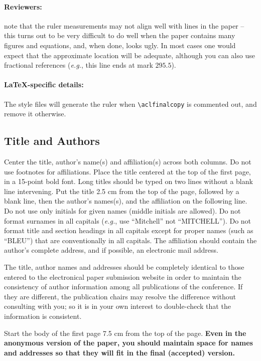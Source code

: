  \paragraph{Reviewers:}
 note that the ruler measurements may not align well with lines in the paper -- this turns out to be very difficult to do well when the paper contains many figures and equations, and, when done, looks ugly.
 In most cases one would expect that the approximate location will be adequate, although you can also use fractional references (\emph{e.g.}, this line ends at mark $295.5$).
 
 \paragraph{\LaTeX-specific details:}
 The style files will generate the ruler when {\small\verb|\aclfinalcopy|} is commented out, and remove it otherwise.
 
 \subsection{Title and Authors}
 \label{ssec:title-authors}
 
 Center the title, author's name(s) and affiliation(s) across both columns.
 Do not use footnotes for affiliations.
 Place the title centered at the top of the first page, in a 15-point bold font.
 Long titles should be typed on two lines without a blank line intervening.
 Put the title 2.5 cm from the top of the page, followed by a blank line, then the author's names(s), and the affiliation on the following line.
 Do not use only initials for given names (middle initials are allowed).
 Do not format surnames in all capitals (\emph{e.g.}, use ``Mitchell'' not ``MITCHELL'').
 Do not format title and section headings in all capitals except for proper names (such as ``BLEU'') that are
 conventionally in all capitals.
 The affiliation should contain the author's complete address, and if possible, an electronic mail address.
 
 The title, author names and addresses should be completely identical to those entered to the electronical paper submission website in order to maintain the consistency of author information among all publications of the conference.
 If they are different, the publication chairs may resolve the difference without consulting with you; so it is in your own interest to double-check that the information is consistent.
 
 Start the body of the first page 7.5 cm from the top of the page.
 \textbf{Even in the anonymous version of the paper, you should maintain space for names and addresses so that they will fit in the final (accepted) version.}
 
